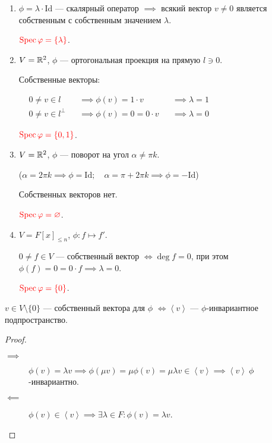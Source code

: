 \begin{enumerate}
    \item $\phi = \lambda \cdot \mathrm{Id}$ --- скалярный оператор $ \implies $ всякий вектор $v \neq 0$ является собственным с собственным значением $\lambda$.

        $\color{red} \operatorname{\mathop{\mathrm{Spec}}} \varphi = \{\lambda\}$.

    \item $V = \mathbb{R}^2$, $\phi$ --- ортогональная проекция на прямую $l \ni 0$.

        Собственные векторы:

        \begin{math}
            \begin{aligned}
                &0 \neq v \in l &&\implies \phi(v) = 1 \cdot v &&\implies \lambda = 1 \\
                &0 \neq v \in l^{\perp} &&\implies \phi(v) = 0 = 0 \cdot v &&\implies \lambda = 0
            \end{aligned}
        \end{math}

        $\color{red} \operatorname{\mathop{\mathrm{Spec}}} \varphi = \{0, 1\}$.

    \item $V = \mathbb{R}^2$, $\phi$ --- поворот на угол $\alpha \neq \pi k$.

        ($\alpha = 2\pi k \implies \phi = \mathrm{Id}; \quad \alpha = \pi + 2 \pi k \implies \phi = -\mathrm{Id}$)

        Собственных векторов нет.

        $\color{red} \operatorname{\mathop{\mathrm{Spec}}} \varphi = \varnothing$.

    \item $V = F[x]_{\leq n}$, $\phi \colon f \mapsto f'$.

        $0 \neq f \in V$ --- собственный вектор $\iff \deg f = 0$, при этом $\phi(f) = 0 = 0 \cdot f \implies \lambda = 0$.

        $\color{red} \operatorname{\mathop{\mathrm{Spec}}} \varphi = \{0\}$.
\end{enumerate}

\medskip
\begin{proposal}
    $v \in V \setminus \{0\} $ --- собственный вектора для $\phi$ $\iff \left< v \right>$ --- $\phi$-инвариантное подпространство.
\end{proposal}

\begin{proof}~
    \begin{description}
    \item[$\implies$] $\phi(v) = \lambda v \implies \phi(\mu v) = \mu \phi(v) = \mu \lambda v \in \left< v \right> \implies \left< v \right> \ \phi$-инвариантно.
    \item[$\impliedby$] $\phi(v) \in \left< v \right> \implies \exists \lambda \in F : \phi(v) = \lambda v$.
        \qedhere
    \end{description}
\end{proof}


